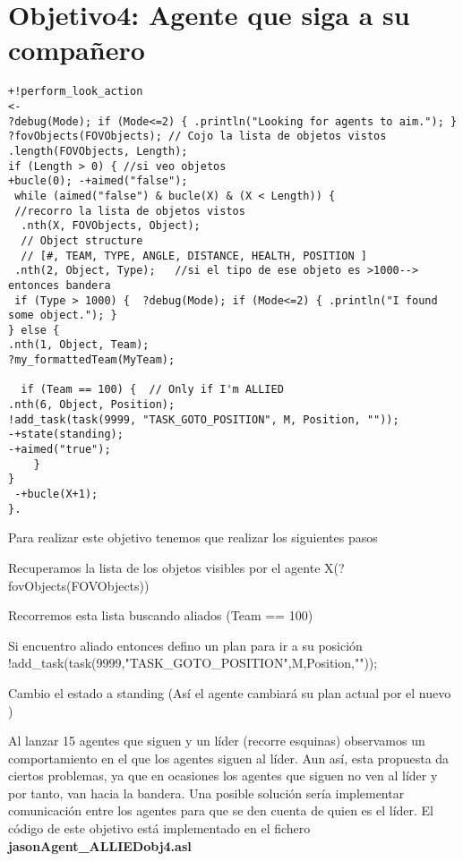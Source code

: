 \documentclass[11pt,oneside,a4paper]{article}
\begin{document}
\section{Objetivo4: Agente que siga a su compañero}
\begin{verbatim}
+!perform_look_action 
<- 
?debug(Mode); if (Mode<=2) { .println("Looking for agents to aim."); }
?fovObjects(FOVObjects); // Cojo la lista de objetos vistos
.length(FOVObjects, Length);
if (Length > 0) { //si veo objetos
+bucle(0); -+aimed("false");
 while (aimed("false") & bucle(X) & (X < Length)) {
 //recorro la lista de objetos vistos                  
  .nth(X, FOVObjects, Object);
  // Object structure
  // [#, TEAM, TYPE, ANGLE, DISTANCE, HEALTH, POSITION ]
 .nth(2, Object, Type);   //si el tipo de ese objeto es >1000--> entonces bandera   
 if (Type > 1000) {  ?debug(Mode); if (Mode<=2) { .println("I found some object."); }
} else { 
.nth(1, Object, Team);
?my_formattedTeam(MyTeam);
 
  if (Team == 100) {  // Only if I'm ALLIED
.nth(6, Object, Position);
!add_task(task(9999, "TASK_GOTO_POSITION", M, Position, ""));
-+state(standing);
-+aimed("true");
	}                                                                                         
}
 -+bucle(X+1);
}.
\end{verbatim}
Para realizar este objetivo tenemos que realizar los siguientes pasos
\begin{list}{•}{}
\item Recuperamos la lista de los objetos visibles por el agente X(?fovObjects(FOVObjects))
\item Recorremos esta lista buscando aliados (Team == 100)
\item Si encuentro aliado entonces defino un plan para ir a su posición !add\_task(task(9999,"TASK\_GOTO\_POSITION",M,Position,""));
\item Cambio el estado a standing (Así el agente cambiará su plan actual por el nuevo )
\end{list}
Al lanzar 15 agentes que siguen y un líder (recorre esquinas) observamos un comportamiento en el que los agentes siguen al líder. Aun así, esta propuesta da ciertos problemas, ya que en ocasiones los agentes que siguen no ven al líder y por tanto, van hacia la bandera. Una posible solución sería implementar comunicación entre los agentes para que se den cuenta de quien es el líder. El código de este objetivo está implementado en el fichero \textbf{jasonAgent\_ALLIEDobj4.asl}
\end{document}
